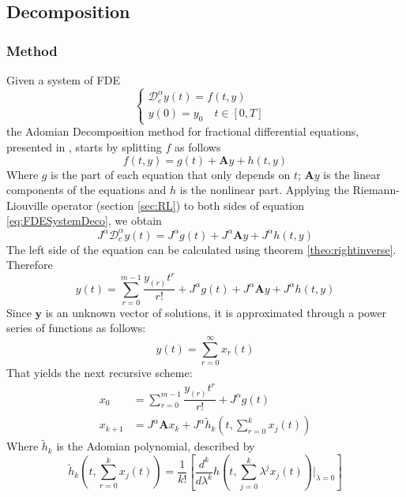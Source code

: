 \subsection{Decomposition}
\subsubsection{Method}
Given a system of FDE
\begin{equation}
\begin{cases}
    \mathcal{D}_c^\alpha y(t)=f(t,y)&\\ y(0)=y_0\quad t\in[0,T]&
\end{cases}
\end{equation}\label{eq:FDESystemDeco}
the Adomian Decomposition method for fractional differential equations, presented in \cite{momani2007numerical}, starts by splitting $f$ as follows
\begin{equation}
    f(t,y)=g(t)+\mathbf{A}y+h(t,y)
\end{equation}
Where $g$ is the part of each equation that only depends on $t$; $\mathbf{A}y$ is the linear components of the equations and $h$ is the nonlinear part. Applying the Riemann-Liouville operator (section \ref{sec:RL}) to both sides of equation \ref{eq:FDESystemDeco}, we obtain
\begin{equation*}
    J^\alpha\mathcal{D}_c^\alpha y(t)=J^\alpha g(t)+J^\alpha\mathbf{A}y+J^\alpha h(t,y)
\end{equation*}
The left side of the equation can be calculated using theorem \ref{theo:rightinverse}. Therefore
\begin{equation*}
    y(t) = \sum_{r=0}^{m-1}\dfrac{y_{(r)}t^r}{r!}+ J^\alpha g(t)+J^\alpha\mathbf{A}y+J^\alpha h(t,y)
\end{equation*}
Since $\mathbf{y}$ is an unknown vector of solutions, it is approximated through a power series of functions as follows:
\begin{equation*}
    y(t)=\sum_{r=0}^\infty x_r(t)
\end{equation*}
That yields the next recursive scheme:
\begin{equation}\label{eq:recur_deco}
    \begin{split}
        x_0&=\sum_{r=0}^{m-1}\dfrac{y_{(r)}t^r}{r!}+J^\alpha g(t)\\
        x_{k+1}&=J^\alpha \mathbf{A}x_k+J^\alpha \tilde{h}_k\left(t,\sum_{r=0}^kx_j(t)\right)
    \end{split}
\end{equation}
Where $\tilde{h}_k$ is the Adomian polynomial, described by
\begin{equation}
    \tilde{h}_k\left(t,\sum_{r=0}^{k}x_j(t)\right)=\dfrac{1}{k!}\left[\dfrac{d^k}{d\lambda^k}h\left(t,\sum_{j=0}^{k}\lambda^jx_j(t)\right)\Bigg|_{\lambda=0}\right]
\end{equation}


